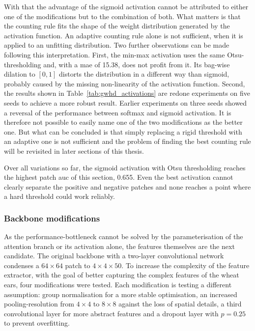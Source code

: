 \documentclass[12pt,parskip = half, DIV=classic,listof=totoc]{scrartcl}
\begin{document}
			With that the advantage of the sigmoid activation cannot be attributed to either one of the modifications but to the combination of both.
			What matters is that the counting rule fits the shape of the weight distribution generated by the activation function. 
			An adaptive counting rule alone is not sufficient, when it is applied to an unfitting distribution.
			Two further observations can be made following this interpretation. First, the min-max activation uses the same Otsu-thresholding
			and, with a \ac{mae} of 15.38, does not profit from it. Its bag-wise dilation to $[0,1]$ distorts the distribution in a different way than sigmoid,
			probably caused by the missing non-linearity of the activation function. Second, the results shown in Table~\ref{tab:gwhd_activations} 
			are redone experiments on five seeds to achieve a more robust result. Earlier experiments on three seeds showed a reversal of the 
			performance between softmax and sigmoid activation. It is therefore not possible to easily name one of the two modifications
			as the better one. But what can be concluded is that simply replacing a rigid threshold with an adaptive one is not sufficient and 
			the problem of finding the best counting rule will be revisited in later sections of this thesis.

			Over all variations so far, the sigmoid activation with Otsu thresholding reaches the highest patch
		    \ac{auc} of this section, 0.655. Even the best activation cannot clearly separate the positive and negative patches and none 
			reaches a point where a hard threshold could work reliably.

			\subsubsection{Backbone modifications}\label{sec:gwhd_backbones}
			As the performance-bottleneck cannot be solved by the parameterisation of the attention branch or its activation alone, the 
			features themselves are the next candidate. The original backbone with a two-layer convolutional network condenses
			a $64\times64$ patch to $4\times4\times50$. To increase the complexity of the feature extractor, with the goal of better
			capturing the complex features of the wheat ears, four modifications were tested. Each modification is testing
			a different assumption: group normalisation for a more stable optimisation, an increased pooling-resolution from $4\times4$ to $8\times8$
			against the loss of spatial details, a third convolutional layer for more abstract features and a dropout layer with $p=0.25$ to prevent overfitting.
\end{document}
